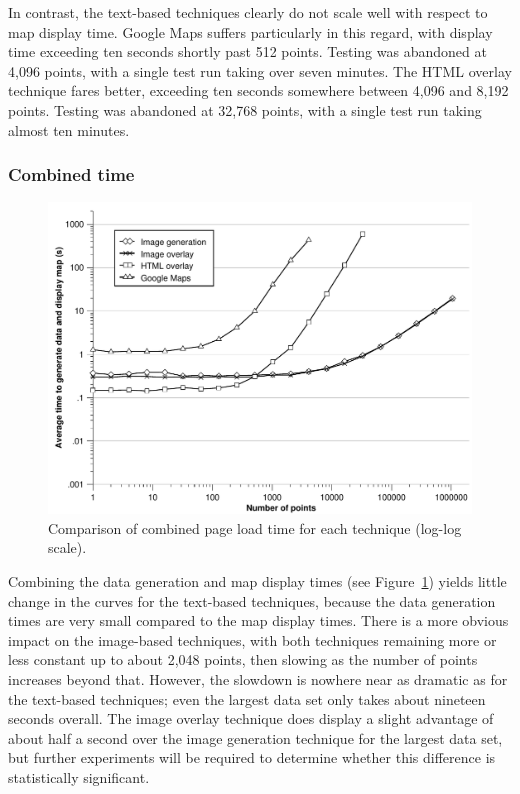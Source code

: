 \documentclass[acmnow]{acmtrans2m}
\begin{document}
In contrast, the text-based techniques clearly do not scale well with
respect to map display time. Google Maps suffers particularly in this
regard, with display time exceeding ten seconds shortly past 512 points.
Testing was abandoned at 4,096 points, with a single test run taking
over seven minutes. The HTML overlay technique fares better, exceeding
ten seconds somewhere between 4,096 and 8,192 points. Testing was
abandoned at 32,768 points, with a single test run taking almost ten
minutes.


\subsubsection{Combined time}


\begin{figure}
	\centering
	\includegraphics[scale=0.55]{combined_time}
	\caption{Comparison of combined page load time for each technique (log-log scale).}
	\label{fig-combined-time}
\end{figure}


Combining the data generation and map display times (see
Figure~\ref{fig-combined-time}) yields little change in the curves for
the text-based techniques, because the data generation times are very
small compared to the map display times. There is a more obvious impact
on the image-based techniques, with both techniques remaining more or
less constant up to about 2,048 points, then slowing as the number of
points increases beyond that. However, the slowdown is nowhere near as
dramatic as for the text-based techniques; even the largest data set
only takes about nineteen seconds overall. The image overlay technique
does display a slight advantage of about half a second over the image
generation technique for the largest data set, but further experiments
will be required to determine whether this difference is statistically
significant.
\end{document}

